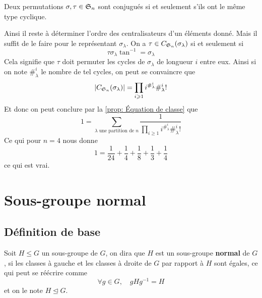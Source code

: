 \begin{proposition}
	Deux permutations $\sigma, \tau \in \S_n$ sont conjugués si et seulement s'ils ont le même type cyclique.
\end{proposition}


Ainsi il reste à déterminer l'ordre des centralisateurs d'un éléments donné. Mais il suffit de le faire pour le représentant $\sigma_\lambda$. On a $\tau \in C_{\S_n}(\sigma_\lambda)$ si et seulement si
\[
\tau \sigma_\lambda \tan^{-1} = \sigma_\lambda
\] 
Cela signifie que $\tau$ doit permuter les cycles de $\sigma_\lambda$ de longueur $i$ entre eux. Ainsi si on note $\#^i_\lambda$ le nombre de tel cycles, on peut se convaincre que
\[
|C_{\S_n}(\sigma_\lambda)| = \prod_{i \geqslant 1} i^{\#^i_\lambda} \#^i_\lambda!
\]
Et donc on peut conclure par la \autoref{prop: Équation de classe} que
\[
1 = \sum_{\lambda \text{ une partition de $n$}} \frac1{\prod_{i \geqslant 1} i^{\#^i_\lambda} \#^i_\lambda!}
\]
Ce qui pour $n=4$ nous donne
\[
1 = \frac1{24} + \frac14 + \frac18 + \frac13 + \frac14
\]
ce qui est vrai.
\section{Sous-groupe normal}


\subsection{Définition de base}

\begin{definition} \label{def: Sous-groupe normal}
	Soit $H \leq G$ un sous-groupe de $G$, on dira que $H$ est un sous-groupe \textbf{normal} de $G$, si les classes à gauche et les classes à droite de $G$ par rapport à $H$ sont égales, ce qui peut se réécrire comme
	\[
	\forall g \in G, \quad g H g^{-1} = H
	\]
	et on le note $H \trianglelefteq G$.
\end{definition}

